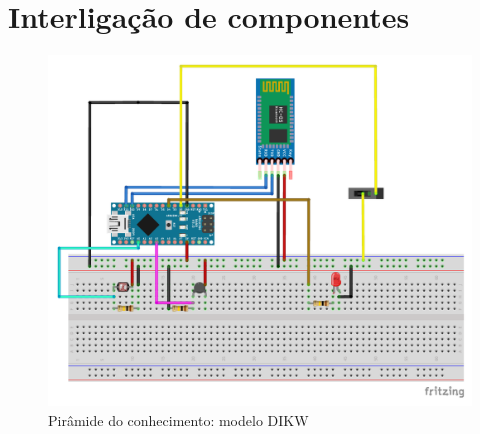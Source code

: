 \chapter{Interligação de componentes}
\label{interlapd}

\begin{figure}[h]
	\centering
	\includegraphics[width=\linewidth]{esquemas/arduino-fritzing/esquema-arduino_bb.pdf}
	\caption{Pirâmide do conhecimento: modelo DIKW}
	\label{dikw}
\end{figure}